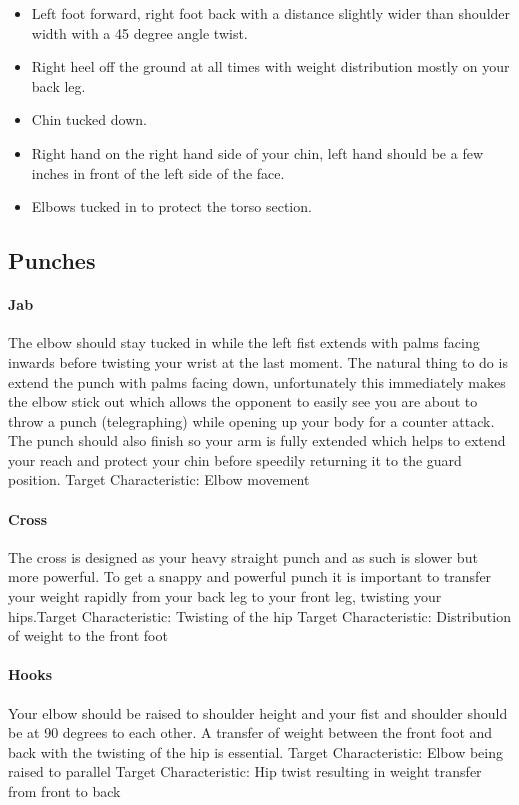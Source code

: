 \begin{itemize}
  \item Left foot forward, right foot back with a distance slightly wider than shoulder width with a 45 degree angle twist.
  \item Right heel off the ground at all times with weight distribution mostly on your back leg.
  \item Chin tucked down.
  \item Right hand on the right hand side of your chin, left hand should be a few inches in front of the left side of the face.
  \item Elbows tucked in to protect the torso section.
\end{itemize}

\subsection{Punches}
\label{subsec:subsec03}
\paragraph{Jab}
The elbow should stay tucked in while the left fist extends with palms facing inwards before twisting your wrist at the last moment. The natural thing to do is extend the punch with palms facing down, unfortunately this immediately makes the elbow stick out which allows the opponent to easily see you are about to throw a punch (telegraphing) while opening up your body for a counter attack. The punch should also finish so your arm is fully extended which helps to extend your reach and protect your chin before speedily returning it to the guard position.\newline
Target Characteristic: Elbow movement

\paragraph{Cross}
The cross is designed as your heavy straight punch and as such is slower but more powerful. To get a snappy and powerful punch it is important to transfer your weight rapidly from your back leg to your front leg, twisting your hips.\newline Target Characteristic: Twisting of the hip\newline
Target Characteristic: Distribution of weight to the front foot


\paragraph{Hooks}
Your elbow should be raised to shoulder height and your fist and shoulder should be at 90 degrees to each other. A transfer of weight between the front foot and back with the twisting of the hip is essential.\newline
Target Characteristic: Elbow being raised to parallel\newline
Target Characteristic: Hip twist resulting in weight transfer from front to back\newline

